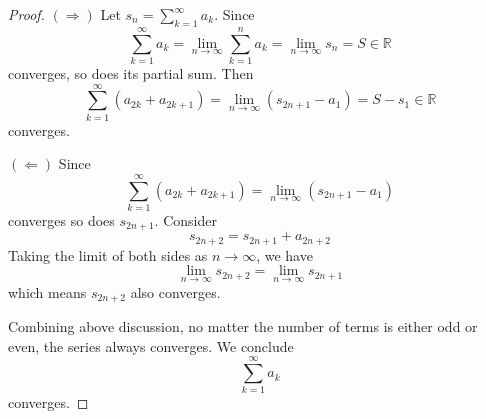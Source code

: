 \documentclass{report}
\begin{document}
\setcounter{Exercise}{8}
\vspace{12pt}
\begin{Exercise}
\begin{proof}
$(\Longrightarrow)$
Let $s_n = \sum_{k=1}^{\infty}a_k$. Since $$\sum_{k=1}^{\infty}a_k = \lim_{n\to\infty}\sum_{k=1}^{n}a_k = \lim_{n\to\infty}s_n = S \in \mathbb{R}$$
converges, so does its partial sum. Then $$\sum_{k=1}^{\infty}(a_{2k}+a_{2k+1}) = \lim_{n\to\infty}(s_{2n+1}-a_1) = S-s_1 \in \mathbb{R}$$ converges. 

\vspace{2ex}

$(\Longleftarrow)$ Since  $$\sum_{k=1}^{\infty}(a_{2k}+a_{2k+1}) = \lim_{n\to\infty}(s_{2n+1}-a_1)$$ converges so does $s_{2n+1}$. Consider $$s_{2n+2} = s_{2n+1}+a_{2n+2}$$
Taking the limit of both sides as $n\to\infty$, we have $$\lim_{n\to\infty}s_{2n+2} = \lim_{n\to\infty}s_{2n+1}$$
which means $s_{2n+2}$ also converges.

\vspace{2ex}

Combining above discussion, no matter the number of terms is either odd or even, the series always converges. We conclude $$ \sum_{k=1}^{\infty}a_k$$ converges.
\end{proof}
\end{Exercise}
\end{document}
